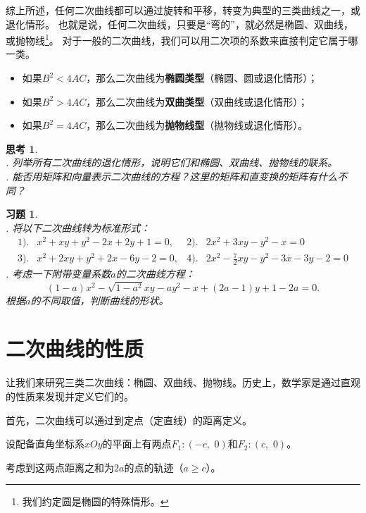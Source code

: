 \documentclass[12pt,UTF8]{ctexbook}
\theoremstyle{definition}
\theoremstyle{plain}
\newtheorem{sk}{思考}[section]
\newtheorem{xt}{习题}[section]
\begin{document}
综上所述，任何二次曲线都可以通过旋转和平移，转变为典型的三类曲线之一，或退化情形。
也就是说，任何二次曲线，只要是“弯的”，就必然是椭圆、双曲线，或抛物线\footnote{我们约定圆是椭圆的特殊情形。}。
对于一般的二次曲线，我们可以用二次项的系数来直接判定它属于哪一类。
\begin{itemize}
    \item 如果$B^2<4AC$，那么二次曲线为\textbf{椭圆类型}（椭圆、圆或退化情形）；
    \item 如果$B^2>4AC$，那么二次曲线为\textbf{双曲类型}（双曲线或退化情形）；
    \item 如果$B^2=4AC$，那么二次曲线为\textbf{抛物线型}（抛物线或退化情形）。
\end{itemize}

\begin{sk}
    \mbox{} \\
    . 列举所有二次曲线的退化情形，说明它们和椭圆、双曲线、抛物线的联系。\\
    . 能否用矩阵和向量表示二次曲线的方程？这里的矩阵和直变换的矩阵有什么不同？
\end{sk}

\begin{xt}
    \mbox{} \\
    . 将以下二次曲线转为标准形式：
    \begin{align*}
        1).& x^2 + xy +y^2 - 2x + 2y + 1 = 0,  &2).& 2x^2 + 3xy -y^2 - x = 0 \\
        3).& x^2 + 2xy + y^2 + 2x - 6y - 2 = 0,  & 4).& 2x^2 - \frac{7}{2}xy - y^2 - 3x - 3y - 2 = 0 
    \end{align*}
    . 考虑一下附带变量系数$a$的二次曲线方程：
    $$ (1 - a)x^2 - \sqrt{1 - a^2}xy - ay^2 - x + (2a - 1)y + 1 - 2a = 0. $$
    根据$a$的不同取值，判断曲线的形状。
\end{xt}

\section{二次曲线的性质}

让我们来研究三类二次曲线：椭圆、双曲线、抛物线。历史上，数学家是通过直观的性质来发现并定义它们的。

首先，二次曲线可以通过到定点（定直线）的距离定义。

设配备直角坐标系$xOy$的平面上有两点$F_1:(-c,\,\,0)$和$F_2:(c,\,\,0)$。

考虑到这两点距离之和为$2a$的点的轨迹（$a\geqslant c$）。
\end{document}
